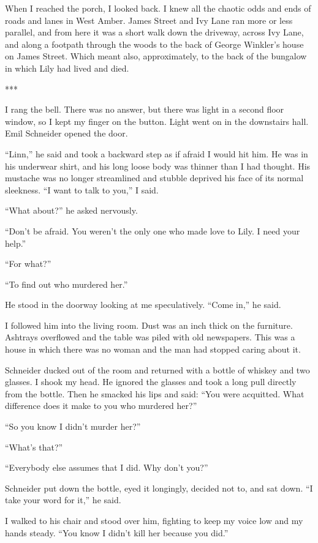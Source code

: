 \documentclass{novel}
\begin{document}
{When I reached the porch, I looked back. I knew all the chaotic odds and ends of roads and lanes in West Amber. James Street and Ivy Lane ran more or less parallel, and from here it was a short walk down the driveway, across Ivy Lane, and along a footpath through the woods to the back of George Winkler’s house on James Street. Which meant also, approximately, to the back of the bungalow in which Lily had lived and died.

***

I rang the bell. There was no answer, but there was light in a second floor window, so I kept my finger on the button. Light went on in the downstairs hall. Emil Schneider opened the door.

“Linn,” he said and took a backward step as if afraid I would hit him. He was in his underwear shirt, and his long loose body was thinner than I had thought. His mustache was no longer streamlined and stubble deprived his face of its normal sleekness. “I want to talk to you,” I said.

“What about?” he asked nervously.

“Don’t be afraid. You weren’t the only one who made love to Lily. I need your help.”

“For what?”

“To find out who murdered her.”

He stood in the doorway looking at me speculatively. “Come in,” he said.

I followed him into the living room. Dust was an inch thick on the furniture. Ashtrays overflowed and the table was piled with old newspapers. This was a house in which there was no woman and the man had stopped caring about it.

Schneider ducked out of the room and returned with a bottle of whiskey and two glasses. I shook my head. He ignored the glasses and took a long pull directly from the bottle. Then he smacked his lips and said: “You were acquitted. What difference does it make to you who murdered her?”

“So you know I didn’t murder her?”

“What’s that?”

“Everybody else assumes that I did. Why don’t you?”

Schneider put down the bottle, eyed it longingly, decided not to, and sat down. “I take your word for it,” he said.

I walked to his chair and stood over him, fighting to keep my voice low and my hands steady. “You know I didn’t kill her because you did.”

}
\end{document}
